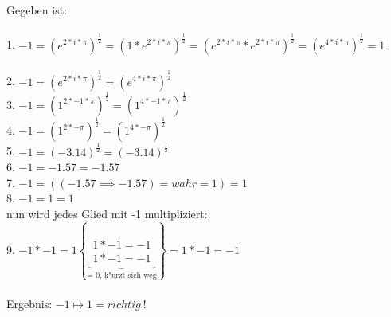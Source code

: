 Gegeben ist:\\ \\
1. $ -1 = (e^{2 * i * \pi})^{\frac{1}{2}} = (1*e^{2 * i * \pi})^{\frac{1}{2}} = (e^{2*i*\pi}*e^{2*i*\pi})^{\frac{1}{2}}=(e^{4*i*\pi})^{\frac{1}{2}} = 1 $ \\
\\
2. $ -1 = (e^{2 * i * \pi})^{\frac{1}{2}} = (e^{4 * i * \pi})^{\frac{1}{2}} $ \\
3. $ -1 = ({1^{2 * -1 * \pi}})^{\frac{1}{2}} = (1^{4 * -1 * \pi})^{\frac{1}{2}} $ \\
4. $ -1 = (1^{2 * -\pi})^{\frac{1}{2}} = (1^{4 * - \pi})^{\frac{1}{2}} $ \\
5. $ -1 = (-3.14)^{\frac{1}{2}} = (-3.14)^{\frac{1}{2}} $ \\
6. $ -1 = -1.57 = -1.57 $ \\
7. $ -1 = ((-1.57 \implies -1.57) = wahr = 1) = 1 $ \\
8. $ -1 = 1 = 1 $ \\
nun wird jedes Glied mit -1 multipliziert: \\
9. $ -1 * -1 = 1 \left\{
  \underbrace{
  \begin{array}{l}
   1 * -1 = -1 \\
   1 * -1 = -1
  \end{array}}_{\text{= 0, k"urzt sich weg}}
  \right\} = 1 * -1 = -1 $ \\
\\
Ergebnis: $ -1 \mapsto 1 = richtig\ ! $ \\

